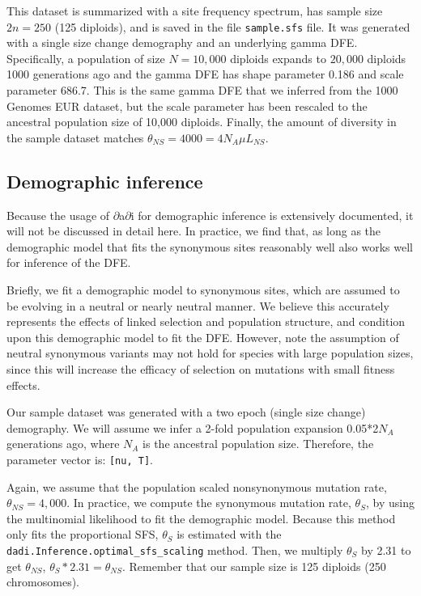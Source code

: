 \documentclass[12pt]{article}
\begin{document}
This dataset is summarized with a site frequency spectrum, has sample size $2n=250$ (125 diploids), and is saved in the file \texttt{sample.sfs} file. It was generated with a single size change demography and an underlying gamma DFE. Specifically, a population of size $N=10,000$ diploids expands to $20,000$ diploids 1000 generations ago and the gamma DFE has shape parameter 0.186 and scale parameter 686.7. This is the same gamma DFE that we inferred from the 1000 Genomes EUR dataset, but the scale parameter has been rescaled to the ancestral population size of 10,000 diploids. Finally, the amount of diversity in the sample dataset matches $\theta_{NS}=4000=4N_A \mu L_{NS}$.

\subsection{Demographic inference}

Because the usage of $\partial$a$\partial$i for demographic inference is extensively documented, it will not be discussed in detail here. In practice, we find that, as long as the demographic model that fits the synonymous sites reasonably well also works well for inference of the DFE.

Briefly, we fit a demographic model to synonymous sites, which are assumed to be evolving in a neutral or nearly neutral manner. We believe this accurately represents the effects of linked selection and population structure, and condition upon this demographic model to fit the DFE. However, note the assumption of neutral synonymous variants may not hold for species with large population sizes, since this will increase the efficacy of selection on mutations with small fitness effects.

Our sample dataset was generated with a two epoch (single size change) demography. We will assume we infer a 2-fold population expansion 0.05*2$N_A$ generations ago, where $N_A$ is the ancestral population size. Therefore, the parameter vector is: \texttt{[nu, T]}.



Again, we assume that the population scaled nonsynonymous mutation rate, $\theta_{NS}=4,000$. In practice, we compute the synonymous mutation rate, $\theta_S$, by using the multinomial likelihood to fit the demographic model. Because this method only fits the proportional SFS, $\theta_S$ is estimated with the \texttt{dadi.Inference.optimal\_sfs\_scaling} method. Then, we multiply $\theta_S$ by 2.31 to get $\theta_{NS}$, $\theta_S * 2.31 = \theta_{NS}$. Remember that our sample size is 125 diploids (250 chromosomes).
\end{document}

